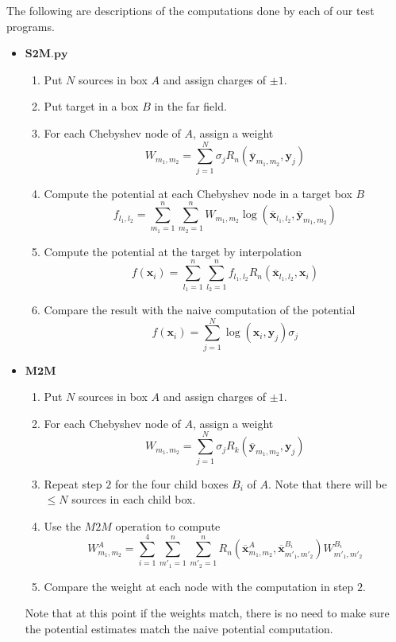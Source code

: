 \documentclass[11pt, oneside]{article}   	%
\begin{document}
\begin{appendices}
The following are descriptions of the computations done by each of our test programs.
\begin{itemize}
\item $\mathbf{S2M.py}$
\begin{enumerate}
\item Put $N$ sources in box $A$ and assign charges of $\pm 1$.
\item Put target in a box $B$ in the far field.
\item For each Chebyshev node of $A$, assign a weight\\
$$W_{m_1,m_2}=\sum_{j=1}^N \sigma_j R_n(\mathbf{\overline{y}}_{m_1,m_2},\mathbf{y}_j)$$
\item Compute the potential at each Chebyshev node in a target box $B$\\
$$f_{l_1,l_2}=\sum_{m_1=1}^n\sum_{m_2=1}^n W_{m_1,m_2} \log(\mathbf{\overline{x}}_{l_1,l_2},\mathbf{\overline{y}}_{m_1,m_2})$$
\item Compute the potential at the target by interpolation\\
$$f(\mathbf{x}_i)=\sum_{l_1=1}^n\sum_{l_2=1}^n f_{l_1,l_2} R_n(\mathbf{\overline{x}}_{l_1,l_2},\mathbf{x}_i)$$
\item Compare the result with the naive computation of the potential\\
$$f(\mathbf{x}_i)=\sum_{j=1}^N \log(\mathbf{x}_i,\mathbf{y}_j) \sigma_j$$
\end{enumerate}

\item $\mathbf{M2M}$
\begin{enumerate}
\item Put $N$ sources in box $A$ and assign charges of $\pm 1$.
\item For each Chebyshev node of $A$, assign a weight\\
$$W_{m_1,m_2}=\sum_{j=1}^N \sigma_jR_k(\mathbf{\overline{y}}_{m_1,m_2},\mathbf{y}_j)$$
\item Repeat step $2$ for the four child boxes $B_i$ of $A$. Note that there will be $\le N$ sources in each child box.
\item Use the $M2M$ operation to compute\\
$$W^A_{m_1,m_2}= \sum_{i=1}^4\sum_{m'_1=1}^n\sum_{m'_2=1}^n R_n(\mathbf{\overline{x}}^{A}_{m_1,m_2},\mathbf{\overline{x}}^{B_i}_{m'_1,m'_2})W^{B_i}_{m'_1,m'_2}$$
\item Compare the weight at each node with the computation in step $2$.
\end{enumerate}
Note that at this point if the weights match, there is no need to make sure the potential estimates match the naive potential computation.\\


\end{itemize}
\end{appendices}
\end{document}
